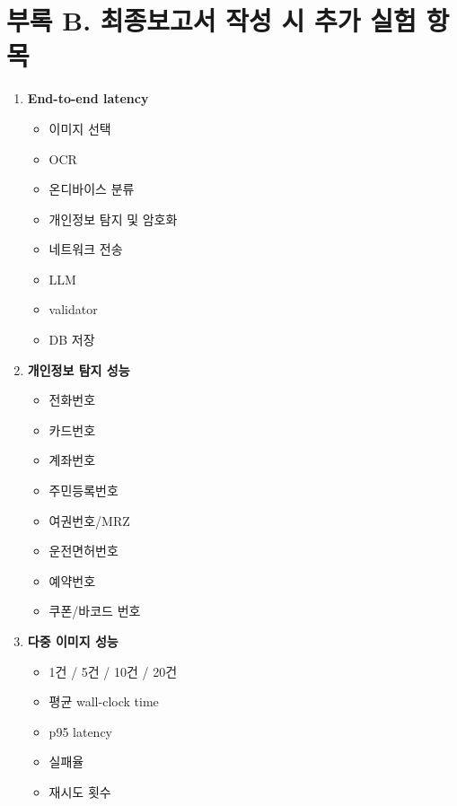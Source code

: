 \documentclass[11pt,a4paper]{article}
\begin{document}
\endgroup

\newpage

\section*{부록 B. 최종보고서 작성 시 추가 실험 항목}

\begin{enumerate}
    \item \textbf{End-to-end latency}
    \begin{itemize}
        \item 이미지 선택
        \item OCR
        \item 온디바이스 분류
        \item 개인정보 탐지 및 암호화
        \item 네트워크 전송
        \item LLM
        \item validator
        \item DB 저장
    \end{itemize}

    \item \textbf{개인정보 탐지 성능}
    \begin{itemize}
        \item 전화번호
        \item 카드번호
        \item 계좌번호
        \item 주민등록번호
        \item 여권번호/MRZ
        \item 운전면허번호
        \item 예약번호
        \item 쿠폰/바코드 번호
    \end{itemize}

    \item \textbf{다중 이미지 성능}
    \begin{itemize}
        \item 1건 / 5건 / 10건 / 20건
        \item 평균 wall-clock time
        \item p95 latency
        \item 실패율
        \item 재시도 횟수
    \end{itemize}


\end{enumerate}
\end{document}
